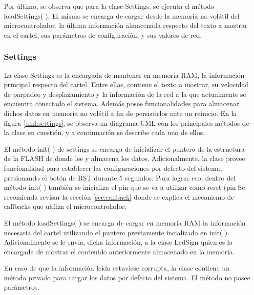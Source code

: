 Por último, se observa que para la clase Settings, se ejecuta el método loadSettings( ).
El mismo se encarga de cargar desde la memoria no volátil del microcontrolador, la última información almacenada respecto del texto a mostrar en el cartel, sus parámetros de configuración, y sus valores de red.


\subsubsection{Settings}

La clase Settings es la encargada de mantener en memoria RAM, la información principal respecto del cartel.
Entre ellas, contiene el texto a mostrar, su velocidad de parpadeo y desplazamiento y la información de la red a la que actualmente se encuentra conectado el sistema.
Además posee funcionalidades para almacenar dichos datos en memoria no volátil a fin de persistirlos ante un reinicio.
En la figura \ref{uml:settings}, se observa un diagrama UML con los principales métodos de la clase en cuestión, y a continuación se describe cada uno de ellos.



El método init( ) de settings se encarga de inicializar el puntero de la estructura de la FLASH de donde lee y almacena los datos.
Adicionalmente, la clase provee funcionalidad para establecer las configuraciones por defecto del sistema, presionando el botón de RST durante 5 segundos.
Para lograr eso, dentro del método init( ) también se inicializa el pin que se va a utilizar como reset (pin %
Se recomienda revisar la sección \ref{sec:callback} donde se explica el mecanismo de callbacks que utiliza el microcontrolador.


El método loadSettings( ) se encarga de cargar en memoria RAM la información necesaria del cartel utilizando el puntero previamente incializado en init( ).
Adicionalmente se le envía, dicha información, a la clase LedSign quien es la encargada de mostrar el contenido anteriormente almacenado en la memoria.

En caso de que la información leída estuviese corrupta, la clase contiene un método privado para cargar los datos por defecto del sistema.
El método no posee parámetros.

